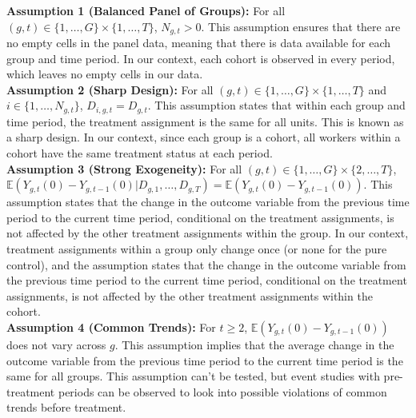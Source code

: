 \documentclass[oneside,11pt]{article}
\begin{document}
\textbf{Assumption 1 (Balanced Panel of Groups):} For all $(g,t) \in \{1, \ldots, G\} \times \{1, \ldots, T\}$, $N_{g,t} > 0$. This assumption ensures that there are no empty cells in the panel data, meaning that there is data available for each group and time period. In our context, each cohort is observed in every period, which leaves no empty cells in our data. \\

\textbf{Assumption 2 (Sharp Design):} For all $(g,t) \in \{1, \ldots, G\} \times \{1, \ldots, T\}$ and $i \in \{1, \ldots, N_{g,t}\}$, $D_{i,g,t} = D_{g,t}$. This assumption states that within each group and time period, the treatment assignment is the same for all units. This is known as a sharp design. In our context, since each group is a cohort, all workers within a cohort have the same treatment status at each period. \\

\textbf{Assumption 3 (Strong Exogeneity):} For all $(g,t) \in \{1, \ldots, G\} \times \{2, \ldots, T\}$, $\mathbb{E}(Y_{g,t}(0) - Y_{g,t-1}(0) | D_{g,1}, \ldots, D_{g,T}) = \mathbb{E}(Y_{g,t}(0) - Y_{g,t-1}(0))$. This assumption states that the change in the outcome variable from the previous time period to the current time period, conditional on the treatment assignments, is not affected by the other treatment assignments within the group. In our context, treatment assignments within a group only change once (or none for the pure control), and the assumption states that the change in the outcome variable from the previous time period to the current time period, conditional on the treatment assignments, is not affected by the other treatment assignments within the cohort. \\

\textbf{Assumption 4 (Common Trends):} For $t \geq 2$, $\mathbb{E}(Y_{g,t}(0) - Y_{g,t-1}(0))$ does not vary across $g$. This assumption implies that the average change in the outcome variable from the previous time period to the current time period is the same for all groups. This assumption can't be tested, but event studies with pre-treatment periods can be observed to look into possible violations of common trends before treatment. \\
\end{document}

